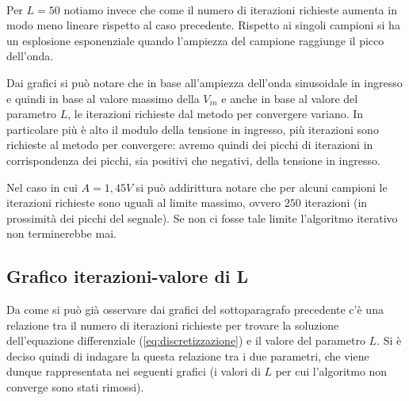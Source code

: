 			\quad\\

			Per $L = 50$ notiamo invece che come il numero di iterazioni richieste aumenta in modo meno lineare rispetto al caso precedente. Rispetto ai singoli campioni si ha un esplosione esponenziale quando l'ampiezza del campione raggiunge il picco dell'onda.
			\graficospace
			\graficospace
			
			Dai grafici si può notare che in base all'ampiezza dell'onda sinusoidale in ingresso e quindi in base al valore massimo della $V_{in}$ e anche in base al valore del parametro $L$, le iterazioni richieste dal metodo per convergere variano. In particolare più è alto il modulo della tensione in ingresso, più iterazioni sono richieste al metodo per convergere: avremo quindi dei picchi di iterazioni in corrispondenza dei picchi, sia positivi che negativi, della tensione in ingresso.
			
			Nel caso in cui $A = 1,45V$ si può addirittura notare che per alcuni campioni le iterazioni richieste sono uguali al limite massimo, ovvero $250$ iterazioni (in prossimità dei picchi del segnale). Se non ci fosse tale limite l'algoritmo iterativo non terminerebbe mai.
			\pagebreak
			
		\subsection{Grafico iterazioni-valore di L}
			Da come si può già osservare dai grafici del sottoparagrafo precedente c'è una relazione tra il numero di iterazioni richieste per trovare la soluzione dell'equazione differenziale (\ref{eq:discretizzazione}) e il valore del parametro $L$. Si è deciso quindi di indagare la questa relazione tra i due parametri, che viene dunque rappresentata nei seguenti grafici (i valori di $L$ per cui l'algoritmo non converge sono stati rimossi).
			
			\graficospace
			\graficospace
			\graficospace
			\graficospace
			\graficospace
			\graficospace
			
